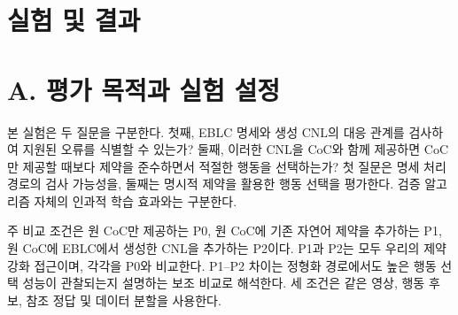 \documentclass[11pt,a4paper]{article}
\begin{document}
\section*{실험 및 결과}

\section*{A. 평가 목적과 실험 설정}

본 실험은 두 질문을 구분한다. 첫째, EBLC 명세와 생성 CNL의 대응 관계를 검사하여 지원된 오류를 식별할 수 있는가? 둘째, 이러한 CNL을 CoC와 함께 제공하면 CoC만 제공할 때보다 제약을 준수하면서 적절한 행동을 선택하는가? 첫 질문은 명세 처리 경로의 검사 가능성을, 둘째는 명시적 제약을 활용한 행동 선택을 평가한다. 검증 알고리즘 자체의 인과적 학습 효과와는 구분한다.\par

주 비교 조건은 원 CoC만 제공하는 P0, 원 CoC에 기존 자연어 제약을 추가하는 P1, 원 CoC에 EBLC에서 생성한 CNL을 추가하는 P2이다. P1과 P2는 모두 우리의 제약 강화 접근이며, 각각을 P0와 비교한다. P1–P2 차이는 정형화 경로에서도 높은 행동 선택 성능이 관찰되는지 설명하는 보조 비교로 해석한다. 세 조건은 같은 영상, 행동 후보, 참조 정답 및 데이터 분할을 사용한다.\par
\end{document}
